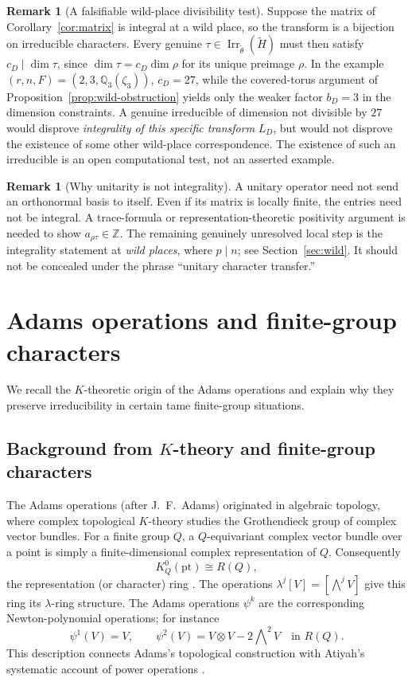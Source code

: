 \documentclass[11pt]{article}
\newcommand{\Irr}{\operatorname{Irr}}
\newcommand{\tH}{\widetilde H}
\theoremstyle{plain}
\theoremstyle{definition}
\newtheorem{remark}[theorem]{Remark}
\begin{document}
\begin{remark}[A falsifiable wild-place divisibility test]\label{rem:wild-test}
Suppose the matrix of Corollary~\ref{cor:matrix} is integral at a
wild place, so the transform is a bijection on irreducible characters.
Every genuine $\tau\in\Irr_{\widetilde\theta}(\tH)$ must then satisfy
$c_D\mid\dim\tau$, since $\dim\tau=c_D\dim\rho$ for its unique
preimage $\rho$. In the example $(r,n,F)=(2,3,\mathbb Q_3(\zeta_3))$,
$c_D=27$, while the covered-torus argument of
Proposition~\ref{prop:wild-obstruction} yields only the weaker
factor $b_D=3$ in the dimension constraints. A genuine irreducible
of dimension not divisible by $27$ would disprove \emph{integrality
of this specific transform} $L_D$, but would not disprove the existence
of some other wild-place correspondence. The existence of such an
irreducible is an open computational test, not an asserted example.
\end{remark}

\begin{remark}[Why unitarity is not integrality]\label{rem:warning}
A unitary operator need not send an orthonormal basis to itself. Even if its matrix is locally finite, the entries need not be integral. A trace-formula or representation-theoretic positivity argument is needed to show $a_{\rho\tau}\in\mathbb Z$. The remaining genuinely unresolved local step is the integrality statement at \emph{wild places}, where $p\mid n$; see Section~\ref{sec:wild}. It should not be concealed under the phrase ``unitary character transfer.''
\end{remark}

\section{Adams operations and finite-group characters}\label{sec:adams}
We recall the $K$-theoretic origin of the Adams operations and
explain why they preserve irreducibility in certain tame
finite-group situations.
\subsection*{Background from $K$-theory and finite-group characters}
The Adams operations (after J.~F.~Adams) originated in algebraic topology, where complex topological
$K$-theory studies the Grothendieck group of complex vector bundles. For a finite
group $Q$, a $Q$-equivariant complex vector bundle over a point is simply a
finite-dimensional complex representation of $Q$. Consequently
\[
K_Q^0(\mathrm{pt})\cong R(Q),
\]
the representation (or character) ring \cite{SegalK}. The operations
$\lambda^j[V]=[\bigwedge^jV]$ give this ring its $\lambda$-ring structure.
The Adams operations $\psi^k$ are the corresponding Newton-polynomial
operations; for instance
\[
\psi^1(V)=V,\qquad
\psi^2(V)=V\otimes V-2\bigwedge\nolimits^2V
\quad\text{in }R(Q).
\]
This description connects Adams's topological construction \cite{Adams62}
with Atiyah's systematic account of power operations \cite{Atiyah66}.
\end{document}
